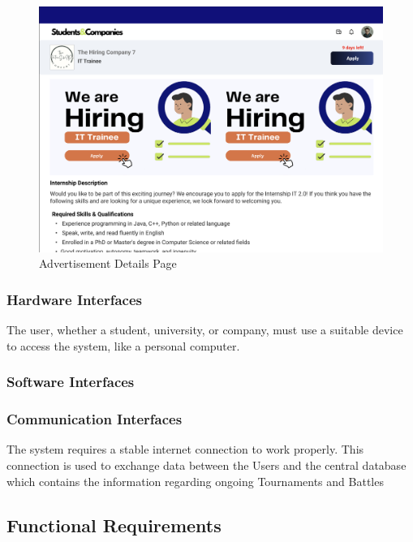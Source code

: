 \documentclass{article}
\begin{document}
\begin{figure}[H]
    \centering
    \includegraphics[scale = 0.40]{figures/UserInterfaces/AdvertisementPage.png}
    \caption{Advertisement Details Page}
     \centering
\end{figure}

\subsubsection{Hardware Interfaces}
    The user, whether a student, university, or company, must use a suitable device to access the system, like a personal computer.
\subsubsection{Software Interfaces}

\subsubsection{Communication Interfaces}
    The system requires a stable internet connection to work properly. This connection is used
    to exchange data between the Users and the central database which contains the information
regarding ongoing Tournaments and Battles
\subsection{Functional Requirements}
\end{document}

